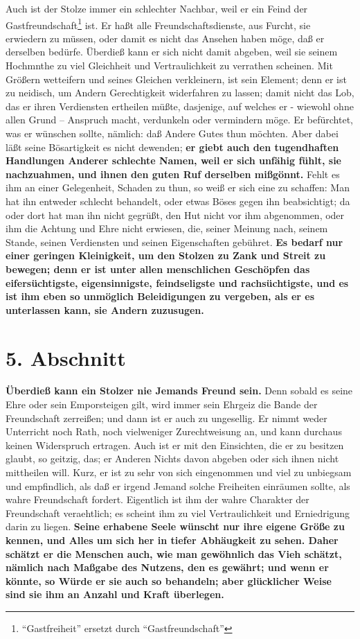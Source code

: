 Auch ist der Stolze immer ein schlechter Nachbar, weil er ein Feind der
Gastfreundschaft\footnote{"`Gastfreiheit"' ersetzt durch
"`Gastfreundschaft"'} ist. Er haßt alle
Freundschaftsdienste, aus Furcht, sie erwiedern
zu müssen, oder damit es nicht das Ansehen haben möge, daß er derselben bedürfe.
Überdieß kann er sich nicht damit abgeben, weil sie seinem Hochmnthe zu viel
Gleichheit und Vertraulichkeit zu verrathen scheinen. Mit
Größern wetteifern und
seines Gleichen verkleinern, ist sein Element; denn er ist zu neidisch, um
Andern Gerechtigkeit widerfahren zu lassen; damit nicht das Lob, das
er ihren
Verdiensten ertheilen müßte, dasjenige, auf welches er - wiewohl ohne allen
Grund -- Anspruch macht, verdunkeln oder vermindern möge. Er befürchtet, was er
wünschen sollte, nämlich: daß Andere Gutes thun möchten. Aber dabei läßt seine
Bösartigkeit es nicht dewenden; \textbf{er giebt auch den tugendhaften
Handlungen
Anderer schlechte Namen, weil er sich unfähig fühlt, sie nachzuahmen, und ihnen
den guten Ruf derselben mißgönnt.} Fehlt es ihm an einer Gelegenheit, Schaden zu
thun, so weiß er sich eine zu schaffen: Man hat ihn entweder schlecht behandelt,
oder etwas Böses gegen ihn beabsichtigt; da oder dort hat man ihn nicht gegrüßt,
den Hut nicht vor ihm abgenommen, oder ihm die Achtung und Ehre nicht erwiesen,
die, seiner Meinung nach, seinem Stande, seinen Verdiensten und seinen
Eigenschaften gebühret. \textbf{Es bedarf nur einer geringen Kleinigkeit, um den
Stolzen
zu Zank und Streit zu bewegen; denn er ist unter allen
menschlichen Geschöpfen
das eifersüchtigste, eigensinnigste, feindseligste und rachsüchtigste, und es
ist ihm eben so unmöglich Beleidigungen zu vergeben, als er es unterlassen kann,
sie Andern zuzusugen.}

\section{5. Abschnitt} \label{kap12_ab5}

\textbf{Überdieß kann ein Stolzer nie Jemands Freund sein.} Denn sobald es seine
Ehre
oder sein Emporsteigen gilt, wird immer sein Ehrgeiz die Bande der Freundschaft
zerreißen; und dann ist er auch zu ungesellig. Er nimmt weder Unterricht noch
Rath, noch vielweniger Zurechtweisung an, und kann
durchaus keinen Widerspruch
ertragen. Auch ist er mit den Einsichten, die er zu besitzen glaubt, so geitzig,
das; er Anderen Nichts davon abgeben oder sich ihnen nicht mittheilen will.
Kurz, er ist zu sehr von sich eingenommen und viel zu unbiegsam und empfindlich,
als daß er irgend Jemand solche Freiheiten einräumen sollte, als wahre
Freundschaft fordert. Eigentlich ist ihm der wahre Charakter der Freundschaft
veraehtlich; es scheint ihm zu viel Vertraulichkeit und Erniedrigung darin zu
liegen. \textbf{Seine erhabene Seele wünscht nur ihre eigene Größe zu kennen,
und Alles
um sich her in tiefer Abhäugkeit zu sehen. Daher schätzt er die Menschen auch,
wie man gewöhnlich das Vieh schätzt, nämlich nach Maßgabe des Nutzens, den es
gewährt; und wenn er könnte, so Würde er sie auch so behandeln; aber glücklicher
Weise sind sie ihm an Anzahl und Kraft überlegen.}

